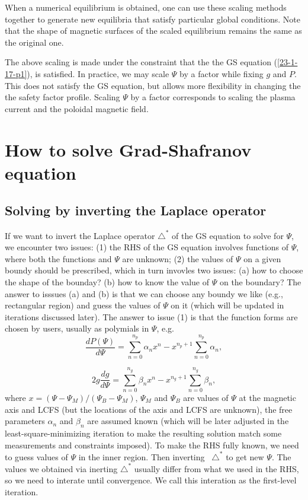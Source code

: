 \documentclass{llncs}
\begin{document}
When a numerical equilibrium is obtained, one can use these scaling methods
together to generate new equilibria that satisfy particular global conditions.
Note that the shape of magnetic surfaces of the scaled equilibrium remains the
same as the original one.

The above scaling is made under the constraint that the the GS equation
(\ref{23-1-17-p1}), is satisfied. In practice, we may scale $\Psi$ by a factor
while fixing $g$ and $P$. This does not satisfy the GS equation, but allows
more flexibility in changing the the safety factor profile. Scaling $\Psi$ by
a factor corresponds to scaling the plasma current and the poloidal magnetic
field.

\section{How to solve Grad-Shafranov equation}

\subsection{Solving by inverting the Laplace operator}

If we want to invert the Laplace operator $\triangle^{\ast}$ of the GS
equation to solve for $\Psi$, we encounter two issues: (1) the RHS of the GS
equation involves functions of $\Psi$, where both the functions and $\Psi$ are
unknown; (2) the values of $\Psi$ on a given boundy should be prescribed,
which in turn invovles two issues: (a) how to choose the shape of the bounday?
(b) how to know the value of $\Psi$ on the boundary? The answer to isssues (a)
and (b) is that we can choose any boundy we like (e.g., rectangular region)
and guess the values of $\Psi$ on it (which will be updated in iterations
discussed later). The answer to issue (1) is that the function forms are
chosen by users, usually as polymials in $\Psi$, e.g. {\cite{lao1985}}
\begin{equation}
  \frac{d P (\Psi)}{d \Psi} = \sum_{n = 0}^{n_p} \alpha_n x^n - x^{n_p + 1}
  \sum_{n = 0}^{n_p} \alpha_n,
\end{equation}

\begin{equation}
  2 g \frac{d g}{d \Psi} = \sum_{n = 0}^{n_g} \beta_n x^n - x^{n_g + 1}
  \sum_{n = 0}^{n_g} \beta_n,
\end{equation}
where $x = (\Psi - \Psi_M) / (\Psi_B - \Psi_M)$, $\Psi_M$ and $\Psi_B$ are
values of $\Psi$ at the magnetic axis and LCFS (but the locations of the axis
and LCFS are unknown), the free parameters $\alpha_n$ and $\beta_n$ are
assumed known (which will be later adjusted in the least-square-minimizing
iteration to make the resulting solution match some measurements and
constraints imposed). To make the RHS fully known, we need to guess values of
$\Psi$ in the inner region. Then inverting \ $\triangle^{\ast}$ to get new
$\Psi$. The values we obtained via inerting $\triangle^{\ast}$ usually differ
from what we used in the RHS, so we need to interate until convergence. We
call this interation as the first-level iteration.
\end{document}
